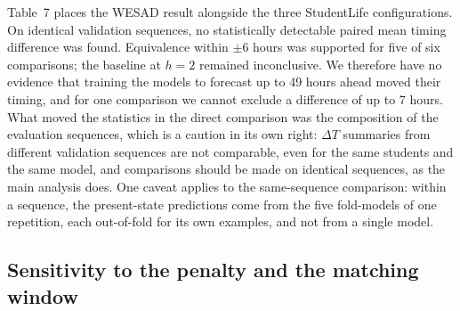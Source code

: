 \documentclass[preprint,12pt,authoryear]{elsarticle}
\newcommand{\dt}{$\Delta T$}
\providecommand{\DIFaddtex}[1]{{\protect\color{blue} \sf #1}} %
\providecommand{\DIFdeltex}[1]{{\protect\color{red} \scriptsize #1}} %
\providecommand{\DIFaddbegin}{} %
\providecommand{\DIFaddend}{} %
\providecommand{\DIFdelbegin}{} %
\providecommand{\DIFdelend}{} %
\providecommand{\DIFadd}[1]{\texorpdfstring{\DIFaddtex{#1}}{#1}} %
\providecommand{\DIFdel}[1]{\texorpdfstring{\DIFdeltex{#1}}{}} %
\newcommand{\DIFscaledelfig}{0.5}
\newlength{\DIFdelgraphicswidth} %
\newlength{\DIFdelgraphicsheight} %
\newcommand{\DIFaddincludegraphics}[2][]{{\color{blue}\fbox{\DIFOincludegraphics[#1]{#2}}}} %
\newcommand{\DIFdelincludegraphics}[2][]{%
\sbox{\DIFdelgraphicsbox}{\DIFOincludegraphics[#1]{#2}}%
\settoboxwidth{\DIFdelgraphicswidth}{\DIFdelgraphicsbox} %
\settoboxtotalheight{\DIFdelgraphicsheight}{\DIFdelgraphicsbox} %
\scalebox{\DIFscaledelfig}{%
\parbox[b]{\DIFdelgraphicswidth}{\usebox{\DIFdelgraphicsbox}\\[-\baselineskip] \rule{\DIFdelgraphicswidth}{0em}}\llap{\resizebox{\DIFdelgraphicswidth}{\DIFdelgraphicsheight}{%
\setlength{\unitlength}{\DIFdelgraphicswidth}%
\begin{picture}(1,1)%
\thicklines\linethickness{2pt} %
{\color[rgb]{1,0,0}\put(0,0){\framebox(1,1){}}}%
{\color[rgb]{1,0,0}\put(0,0){\line( 1,1){1}}}%
{\color[rgb]{1,0,0}\put(0,1){\line(1,-1){1}}}%
\end{picture}%
}\hspace*{3pt}}} %
} %
\DeclareRobustCommand{\DIFaddbegin}{\DIFOaddbegin \let\includegraphics\DIFaddincludegraphics} %
\DeclareRobustCommand{\DIFaddend}{\DIFOaddend \let\includegraphics\DIFOincludegraphics} %
\DeclareRobustCommand{\DIFdelbegin}{\DIFOdelbegin \let\includegraphics\DIFdelincludegraphics} %
\DeclareRobustCommand{\DIFdelend}{\DIFOaddend \let\includegraphics\DIFOincludegraphics} %
\begin{document}
\DIFdelbegin %
\DIFdel{Table~7 places the
WESAD result alongside the three StudentLife configurations.
}\DIFdelend \DIFaddbegin \DIFadd{On identical validation sequences, no statistically detectable paired mean timing difference was found.
Equivalence within $\pm 6$ hours was supported for five of six comparisons; the baseline at $h = 2$ remained inconclusive.
We therefore have no evidence that training the models to forecast up
to 49 hours ahead moved their timing, and for one comparison we cannot
exclude a difference of up to 7 hours. What moved the statistics in the
direct comparison was the composition of the
evaluation sequences, which is a caution in its own right: \dt{}
summaries from different validation sequences are not comparable, even
for the same students and the same model, and comparisons should be
made on identical sequences, as the main analysis does. One caveat
applies to the same-sequence comparison: within a sequence, the
present-state predictions come from the five fold-models of one
repetition, each out-of-fold for its own examples, and not from a
single model.
}\DIFaddend 

\DIFdelbegin %
\DIFdelend \DIFaddbegin \subsection{Sensitivity to the penalty and the matching window}
\label{sec:grid}
\DIFaddend 
\end{document}
